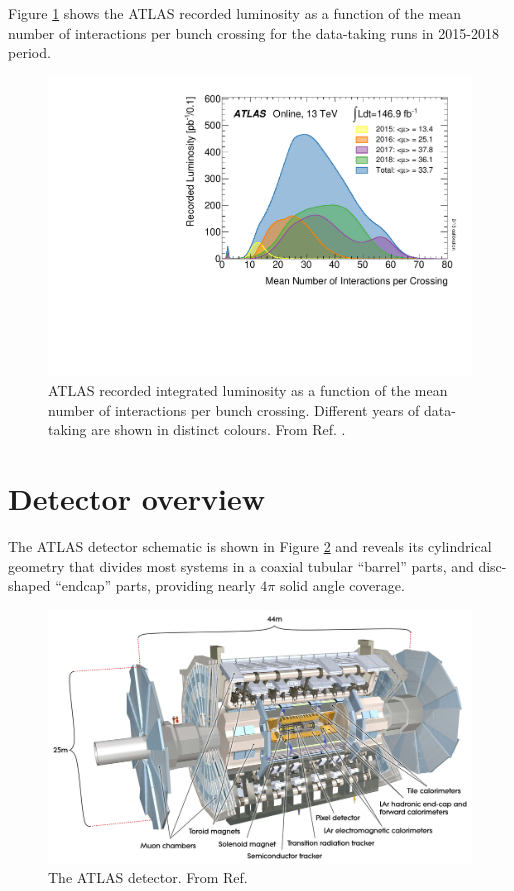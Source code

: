 Figure \ref{fig:exp:pileup} shows the ATLAS recorded luminosity as a
function of the mean number of interactions per bunch crossing for
the data-taking runs in 2015-2018 period.

\begin{figure}[h]
  \centering
  \includegraphics[width=1\textwidth]{figures/experiment/pileup}
  \caption[Mean number of interactions per bunch crossing]{ATLAS recorded
  integrated luminosity as a function of the mean number
  of interactions per bunch crossing. Different years of data-taking
  are shown in distinct colours. From Ref. \cite{pileup}.}
  \label{fig:exp:pileup}
\end{figure}

\section{Detector overview}

The ATLAS detector schematic is shown in Figure \ref{fig:exp:atlas} and
reveals its cylindrical geometry that divides most systems in a coaxial 
tubular ``barrel'' parts, and disc-shaped ``endcap'' parts, providing
nearly $4\pi$ solid angle coverage.

\begin{figure}[h]
  \centering
  \includegraphics[width=1\textwidth]{figures/experiment/atlas}
  \caption[The ATLAS detector.]{The ATLAS detector. From Ref. \cite{CERN:39038}}
   \label{fig:exp:atlas}
\end{figure}

